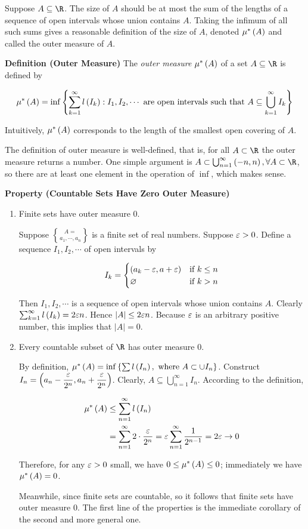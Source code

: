 \documentclass[
]{article}
\begin{document}
Suppose \(A\subseteq \R\). The size of \(A\) should be at most the sum
of the lengths of a sequence of open intervals whose union contains
\(A\). Taking the infimum of all such sums gives a reasonable definition
of the size of \(A\), denoted \(\mu^*\left(A\right)\) and called the outer measure of
\(A\).

\textbf{Definition (Outer Measure)} The \emph{outer measure} \(\mu^*\left(A\right)\)
of a set \(A\subseteq \R\) is defined by

\[\mu^*\left(A\right) = \inf\left\{\sum_{k = 1}^{\infty}l\left(I_k\right):I_1,I_2,\cdots \text{ are open intervals such that }A\subseteq \bigcup_{k = 1}^{\infty}I_k\right\}\]

Intuitively, \(\mu^*\left(A\right)\) corresponds to the length of the smallest
open covering of \(A\).

The definition of outer measure is well-defined, that is, for all
\(A\subset \R\) the outer measure returns a number. One simple argument
is \(A\subset \bigcup_{n = 1}^{\infty}\pr{-n,n}, \forall A\subset \R\),
so there are at least one element in the operation of \(\inf\), which
makes sense.

\textbf{Property (Countable Sets Have Zero Outer Measure)}

\begin{enumerate}
\def\labelenumi{\arabic{enumi}.}
\item
  Finite sets have outer measure \(0\).

  Suppose \(A = \brace{a_1,\cdots,a_n}\) is a finite set of real
  numbers. Suppose \(\varepsilon>0\). Define a sequence \(I_1,I_2,\cdots\) of
  open intervals by

  \[I_k = \begin{cases}
  \left(a_k-\varepsilon,a+\varepsilon\right) & \text{if }k\le n\\
  \varnothing  & \text{if } k>n
  \end{cases}\]

  Then \(I_1,I_2,\cdots\) is a sequence of open intervals whose union
  contains \(A\). Clearly \(\sum_{k = 1}^{\infty}l\left(I_k\right) = 2\varepsilon n\).
  Hence \(|A|\le 2\varepsilon n\). Because \(\varepsilon\) is an arbitrary positive
  number, this implies that \(|A| = 0\).
\item
  Every countable subset of \(\R\) has outer measure \(0\).

  By definition,
  \(\mu^*\left(A\right) = \inf\left\{\sum l\left(I_n\right),\text{ where } A\subset \cup I_n\right\}\).
  Construct
  \(I_n = \left(a_n - \dfrac{\varepsilon}{2^n},a_n + \dfrac{\varepsilon}{2^n}\right)\). Clearly,
  \(A\subseteq \bigcup_{n = 1}^{\infty}I_n\). According to the
  definition,

  \[\begin{aligned}
  \mu^*\left(A\right) & \le \sum_{n = 1}^{\infty}l\left(I_n\right)\\
  & = \sum_{n = 1}^{\infty}2\cdot \frac{\varepsilon}{2^n} = \varepsilon\sum_{n  =1}^{\infty}\frac{1}{2^{n-1}} = 2\varepsilon\to 0
  \end{aligned}\]

  Therefore, for any \(\varepsilon>0\) small, we have \(0\le \mu^*\left(A\right)\le 0\);
  immediately we have \(\mu^*\left(A\right) = 0\).

  Meanwhile, since finite sets are countable, so it follows that finite
  sets have outer measure \(0\). The first line of the properties is the
  immediate corollary of the second and more general one.
\end{enumerate}
\end{document}

